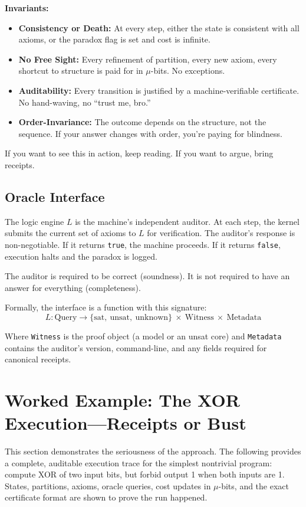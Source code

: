 \documentclass[11pt]{article}
\begin{document}
\textbf{Invariants:}
\begin{itemize}
  \item \textbf{Consistency or Death:} At every step, either the state is consistent with all axioms, or the paradox flag is set and cost is infinite.
  \item \textbf{No Free Sight:} Every refinement of partition, every new axiom, every shortcut to structure is paid for in $\mu$-bits. No exceptions.
  \item \textbf{Auditability:} Every transition is justified by a machine-verifiable certificate. No hand-waving, no “trust me, bro.”
  \item \textbf{Order-Invariance:} The outcome depends on the structure, not the sequence. If your answer changes with order, you’re paying for blindness.
\end{itemize}

If you want to see this in action, keep reading. If you want to argue, bring receipts.

\subsection{Oracle Interface}
The logic engine $L$ is the machine's independent auditor. At each step, the kernel submits the current set of axioms to $L$ for verification. The auditor's response is non-negotiable. If it returns \texttt{true}, the machine proceeds. If it returns \texttt{false}, execution halts and the paradox is logged.

The auditor is required to be correct (soundness). It is not required to have an answer for everything (completeness).

Formally, the interface is a function with this signature:
$$
L : \mathrm{Query} \to \{\mathrm{sat},\ \mathrm{unsat},\ \mathrm{unknown}\}\ \times\ \mathrm{Witness}\ \times\ \mathrm{Metadata}
$$

Where \texttt{Witness} is the proof object (a model or an unsat core) and \texttt{Metadata} contains the auditor's version, command-line, and any fields required for canonical receipts.

\section{Worked Example: The XOR Execution—Receipts or Bust}
This section demonstrates the seriousness of the approach. The following provides a complete, auditable execution trace for the simplest nontrivial program: compute XOR of two input bits, but forbid output 1 when both inputs are 1. States, partitions, axioms, oracle queries, cost updates in $\mu$-bits, and the exact certificate format are shown to prove the run happened.
\end{document}
